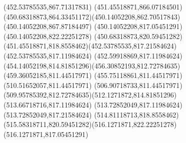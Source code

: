 {{\lineto(452.53785535,867.71317831)
\curveto(451.45518871,866.07184501)(450.68318873,864.33451172)(450.14052208,862.70517843)
\lineto(450.14052208,867.87184497)
\closepath
\moveto(450.14052208,817.05451291)
\lineto(450.14052208,822.22251278)
\curveto(450.68318873,820.59451282)(451.45518871,818.8558462)(452.53785535,817.21584624)
\lineto(452.53785535,817.11984624)
\lineto(452.59918869,817.11984624)
\curveto(454.14052198,814.81851296)(456.30852193,812.72784635)(459.36052185,811.44517971)
\lineto(455.75118861,811.44517971)
\closepath
\moveto(510.51652057,811.44517971)
\lineto(506.90718733,811.44517971)
\curveto(509.95785392,812.72784635)(512.1271872,814.81851296)(513.66718716,817.11984624)
\lineto(513.72852049,817.11984624)
\lineto(513.72852049,817.21584624)
\curveto(514.81118713,818.8558462)(515.58318711,820.59451282)(516.1271871,822.22251278)
\lineto(516.1271871,817.05451291)
\closepath
}
}
{
}
